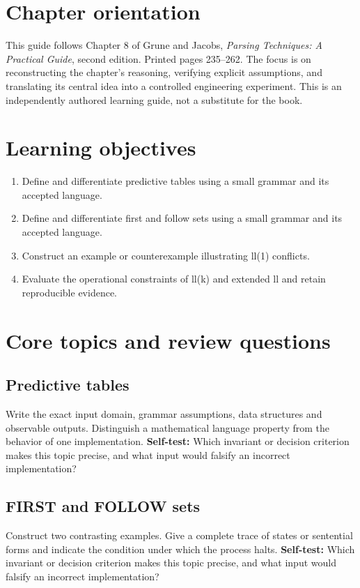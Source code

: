\documentclass[11pt,letterpaper]{article}
\begin{document}
\makedoctitle\makedocsummary
\tableofcontents\clearpage
\section{Chapter orientation}
This guide follows Chapter 8 of Grune and Jacobs, \emph{Parsing Techniques: A Practical Guide}, second edition. Printed pages 235--262. The focus is on reconstructing the chapter's reasoning, verifying explicit assumptions, and translating its central idea into a controlled engineering experiment. This is an independently authored learning guide, not a substitute for the book.
\section{Learning objectives}
\begin{enumerate}
\item Define and differentiate predictive tables using a small grammar and its accepted language.
\item Define and differentiate first and follow sets using a small grammar and its accepted language.
\item Construct an example or counterexample illustrating ll(1) conflicts.
\item Evaluate the operational constraints of ll(k) and extended ll and retain reproducible evidence.
\end{enumerate}
\section{Core topics and review questions}
\subsection{Predictive tables}
Write the exact input domain, grammar assumptions, data structures and observable outputs. Distinguish a mathematical language property from the behavior of one implementation.
\textbf{Self-test:} Which invariant or decision criterion makes this topic precise, and what input would falsify an incorrect implementation?
\subsection{FIRST and FOLLOW sets}
Construct two contrasting examples. Give a complete trace of states or sentential forms and indicate the condition under which the process halts.
\textbf{Self-test:} Which invariant or decision criterion makes this topic precise, and what input would falsify an incorrect implementation?
\end{document}
